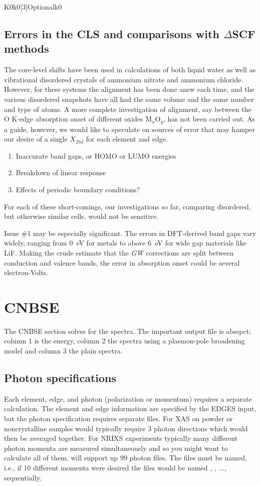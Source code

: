 \documentclass[11pt]{report}
\begin{document}
\begin{Card}{K0}{k0[3]}{Optional}{k0}
\section{Errors in the CLS and comparisons with $\Delta$SCF methods}

The core-level shifts have been used in  calculations of both liquid water as well as vibrational disordered crystals of ammonium nitrate and ammonium chloride. 
However, for these systems the alignment has been done anew each time, and the various disordered snapshots have all had the same volume and the same number and type of atoms.
A more complete investigation of alignment, say between the O K-edge absorption onset of different oxides M$_x$O$_y$, has not been carried out.
As a guide, however, we would like to speculate on sources of error that may hamper our desire of a single $X_{Znl}$ for each element and edge.
\begin{enumerate}
\item{Inaccurate band gaps, or HOMO or LUMO energies}
\item{Breakdown of linear response}
\item{Effects of periodic boundary conditions?}
\end{enumerate}
For each of these short-comings, our investigations so far, comparing disordered, but otherwise similar cells, would not be sensitive.

Issue \#1 may be especially significant. The errors in DFT-derived band gaps vary widely, ranging from 0~eV for metals to above 6~eV for wide gap materials like LiF.
Making the crude estimate that the {\it GW} corrections are split between conduction and valence bands, the error in absorption onset could be several electron-Volts.

\chapter{ CNBSE }
The CNBSE section solves for the spectra. The important output file is absspct; column 1 is the energy, 
column 2 the spectra using a plasmon-pole broadening model and column 3 the plain spectra.

\iffalse
\section{Photon specifications}

Each element, edge, and photon (polarization or momentum) requires a separate calculation. 
The element and edge information are specified by the EDGES input, but the photon specification requires separate files. For XAS on 
powder or noncrystalline samples would typically require 3 photon directions which would then be averaged together. For NRIXS 
experiments typically many different photon momenta are measured simultaneously and so you might want to calculate all of them. 
 will support up 99 photon files. The files must be named, i.e., if 10 different momenta were desired the files would be named 
, , ...,  sequentially. 


\end{Card}
\end{document}

